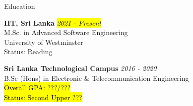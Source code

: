 \documentclass[
	11pt, %
]{./assets/resume} %
\begin{document}

\begin{rSection}{Education}

	\textbf{IIT, Sri Lanka} \hfill \textit{\hl{2021 - Present}} \\ 
	M.Sc. in Advanced Software Engineering \\
	University of Westminster \\
	Status: Reading

	\textbf{Sri Lanka Technological Campus} \hfill \textit{2016 - 2020} \\ 
    B.Sc (Hons) in Electronic \& Telecommunication Engineering \\
	\hl{Overall GPA: ???/???} \\
	\hl{Status: Second Upper ??? }
	
	
\end{rSection}

\end{document}
